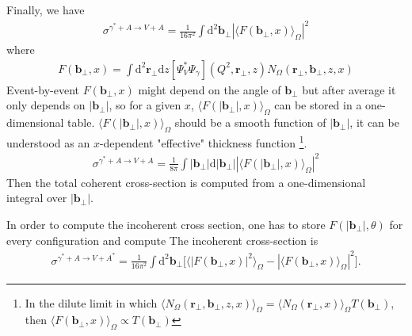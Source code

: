 \documentclass[prd,superscriptaddress,floatfix,nopacs,preprintnumbers,nofootinbib]{revtex4-2}
\newcommand{\vect}[1]{\boldsymbol{#1}_{\perp}}
\newcommand{\bt}{\vect{b}}
\newcommand{\rt}{\vect{r}}
\newcommand{\der}{\mathrm{d}}
\begin{document}
Finally, we have
\begin{align}
    \sigma^{\gamma^* + A \to V + A}  = \frac{1}{16\pi^2} \int \der^2 \bt |\langle F(\bt,x) \rangle_{\Omega}|^2
\end{align}
where
\begin{align}
    F(\bt,x) = \int \der^2 {\rt} \der z   [\Psi_V^* \Psi_\gamma] (Q^2,\rt,z) N_\Omega(\rt,\bt,z,x) 
\end{align}
Event-by-event $F(\bt,x)$ might depend on the angle of $\bt$ but after average it only depends on $|\bt|$, so for a given $x$, $\langle F(|\bt|,x) \rangle_{\Omega}$ can be stored in a one-dimensional table. $\langle F(|\bt|,x) \rangle_{\Omega}$ should be a smooth function of $|\bt|$, it can be understood as an $x$-dependent "effective" thickness function \footnote{In the dilute limit in which $\langle N_\Omega(\rt,\bt,z,x) 
\rangle_{\Omega} = \langle N_\Omega(\rt,x) \rangle_{\Omega} T(\bt)$, then $\langle F(\bt,x) \rangle_{\Omega} \propto T(\bt)$}.
\begin{align}
    \sigma^{\gamma^* + A \to V + A}  = \frac{1}{8\pi} \int |\bt| \der |\bt| |\langle F(|\bt|,x) \rangle_{\Omega}|^2
\end{align}
Then the total coherent cross-section is computed from a one-dimensional integral over $|\bt|$.

In order to compute the incoherent cross section, one has to store $F(|\bt|,\theta)$ for every configuration and compute
The incoherent cross-section is
\begin{align}
    \sigma^{\gamma^* + A \to V + A^*}  = \frac{1}{16\pi^2} \int \der^2 \bt \Big[\langle |F(\bt,x) |^2 \rangle_{\Omega} -  |\langle F(\bt,x) \rangle_{\Omega} |^2  
 \Big].
\end{align}
\end{document}
